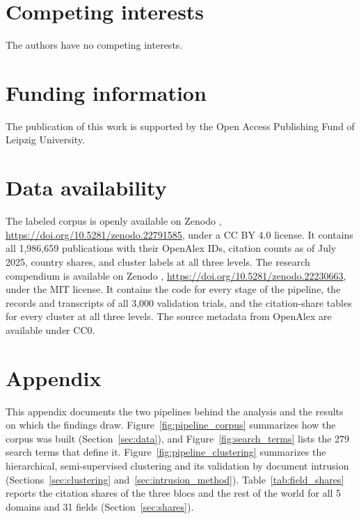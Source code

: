 \documentclass[10pt,twocolumn,a4paper]{article}
\begin{document}
	\section*{Competing interests}
	The authors have no competing interests.
	
	\section*{Funding information}
	The publication of this work is supported by the Open Access Publishing Fund of Leipzig University.
	
	\section*{Data availability}
	The labeled corpus is openly available on Zenodo \parencite{pfundstein2026dataset}, \url{https://doi.org/10.5281/zenodo.22791585}, under a CC BY 4.0 license. It contains all 1,986,659 publications with their OpenAlex IDs, citation counts as of July 2025, country shares, and cluster labels at all three levels. The research compendium is available on Zenodo \parencite{pfundstein2026compendium}, \url{https://doi.org/10.5281/zenodo.22230663}, under the MIT license. It contains the code for every stage of the pipeline, the records and transcripts of all 3,000 validation trials, and the citation-share tables for every cluster at all three levels. The source metadata from OpenAlex are available under CC0.
	
	\printbibliography[title=References]
	
	\appendix
	\clearpage
	\section*{Appendix}
	\setcounter{figure}{0}
	\setcounter{table}{0}
	\renewcommand{\thefigure}{A\arabic{figure}}
	\renewcommand{\thetable}{A\arabic{table}}
	
	\noindent This appendix documents the two pipelines behind the analysis and the results on which the findings draw. Figure~\ref{fig:pipeline_corpus} summarizes how the corpus was built (Section~\ref{sec:data}), and Figure~\ref{fig:search_terms} lists the 279 search terms that define it. Figure~\ref{fig:pipeline_clustering} summarizes the hierarchical, semi-supervised clustering and its validation by document intrusion (Sections~\ref{sec:clustering} and~\ref{sec:intrusion_method}). Table~\ref{tab:field_shares} reports the citation shares of the three blocs and the rest of the world for all 5 domains and 31 fields (Section~\ref{sec:shares}).
	
\end{document}
